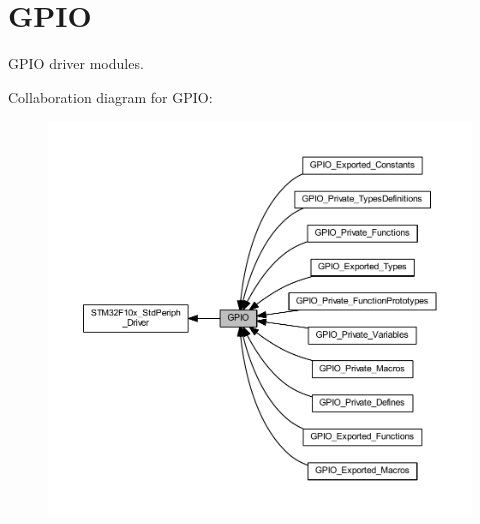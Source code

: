 \hypertarget{group___g_p_i_o}{}\section{G\+P\+IO}
\label{group___g_p_i_o}


G\+P\+IO driver modules.  


Collaboration diagram for G\+P\+IO\+:
\nopagebreak
\begin{figure}[H]
\begin{center}
\leavevmode
\includegraphics[width=350pt]{group___g_p_i_o}
\end{center}
\end{figure}
